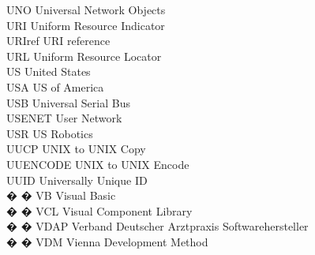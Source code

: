 \begin{tabbing}
    \>UNO \>\>Universal Network Objects\\


    \>URI \>\>Uniform Resource Indicator\\

    \>URIref \>\>URI reference\\

    \>URL \>\>Uniform Resource Locator\\


    \>US \>\>United States\\

    \>USA \>\>US of America\\

    \>USB \>\>Universal Serial Bus\\

    \>USENET \>\>User Network\\

    \>USR \>\>US Robotics\\

    \>UUCP \>\>UNIX to UNIX Copy\\

    \>UUENCODE \>\>UNIX to UNIX Encode\\

    \>UUID \>\>Universally Unique ID\\



� � \>VB \>\>Visual Basic\\


� � \>VCL \>\>Visual Component Library\\

� � \>VDAP \>\>Verband Deutscher Arztpraxis Softwarehersteller\\


� � \>VDM \>\>Vienna Development Method\\


\end{tabbing}
